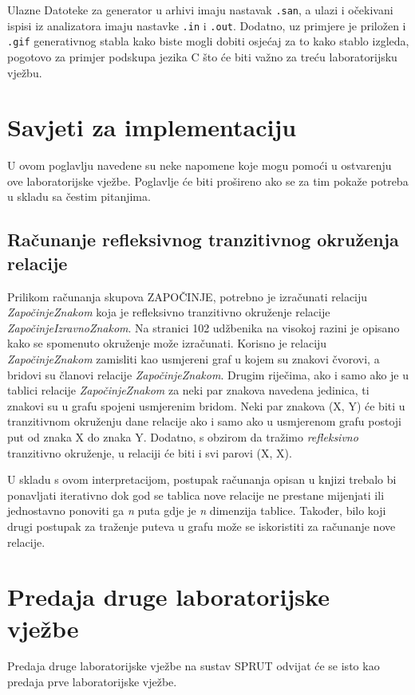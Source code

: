 \documentclass[times, 12pt, utf8]{book}
\begin{document}
Ulazne Datoteke za generator u arhivi imaju nastavak \verb|.san|, a ulazi i očekivani ispisi iz analizatora imaju nastavke \verb|.in| i \verb|.out|.
Dodatno, uz primjere je priložen i \verb|.gif| generativnog stabla kako biste mogli dobiti osjećaj za to kako stablo izgleda, pogotovo za primjer podskupa jezika C što će biti važno za treću laboratorijsku vježbu.

\section{Savjeti za implementaciju}
U ovom poglavlju navedene su neke napomene koje mogu pomoći u ostvarenju ove laboratorijske vježbe.
Poglavlje će biti prošireno ako se za tim pokaže potreba u skladu sa čestim pitanjima.

\subsection{Računanje refleksivnog tranzitivnog okruženja relacije}
Prilikom računanja skupova ZAPOČINJE, potrebno je izračunati relaciju {\em ZapočinjeZnakom} koja je refleksivno tranzitivno okruženje relacije {\em ZapočinjeIzravnoZnakom}.
Na stranici 102 udžbenika na visokoj razini je opisano kako se spomenuto okruženje može izračunati.
Korisno je relaciju {\em ZapočinjeZnakom} zamisliti kao usmjereni graf u kojem su znakovi čvorovi, a bridovi su članovi relacije {\em ZapočinjeZnakom}.
Drugim riječima, ako i samo ako je u tablici relacije {\em ZapočinjeZnakom} za neki par znakova navedena jedinica, ti znakovi su u grafu spojeni usmjerenim bridom.
Neki par znakova (X, Y) će biti u tranzitivnom okruženju dane relacije ako i samo ako u usmjerenom grafu postoji put od znaka X do znaka Y.
Dodatno, s obzirom da tražimo {\em refleksivno} tranzitivno okruženje, u relaciji će biti i svi parovi (X, X).

U skladu s ovom interpretacijom, postupak računanja opisan u knjizi trebalo bi ponavljati iterativno dok god se tablica nove relacije ne prestane mijenjati ili jednostavno ponoviti ga {\em n} puta gdje je {\em n} dimenzija tablice.
Također, bilo koji drugi postupak za traženje puteva u grafu može se iskoristiti za računanje nove relacije.

\section{Predaja druge laboratorijske vježbe}
Predaja druge laboratorijske vježbe na sustav SPRUT odvijat će se isto kao predaja prve laboratorijske vježbe.
\end{document}

